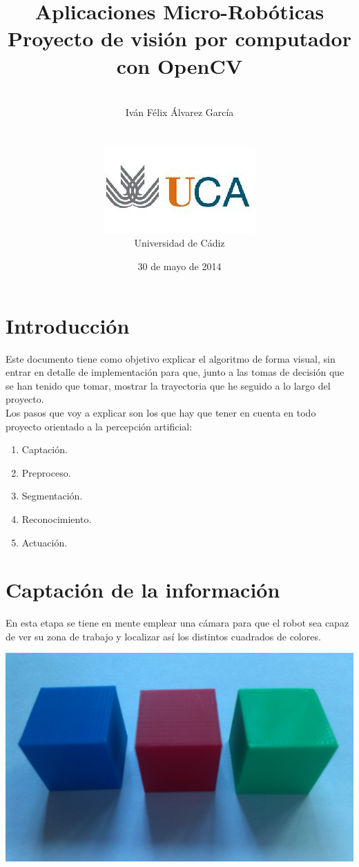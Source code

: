 \documentclass[11pt]{article}
\title{\textbf{Aplicaciones Micro-Robóticas\\
		       Proyecto de visión por computador con OpenCV}}
\author{\\Iván Félix Álvarez García\\\\\\
		\includegraphics[scale=0.45]{logo_uca}\\
		Universidad de Cádiz}
\date{30 de mayo de 2014}
\begin{document}
\maketitle
\newpage

\section{Introducción}

Este documento tiene como objetivo explicar el algoritmo de forma visual, sin entrar en detalle de implementación para que, junto a las tomas de decisión que se han tenido que tomar, mostrar la trayectoria que he seguido a lo largo del proyecto.
\\
Los pasos que voy a explicar son los que hay que tener en cuenta en todo proyecto orientado a la percepción artificial:

\begin{enumerate}
\item Captación.
\item Preproceso.
\item Segmentación.
\item Reconocimiento.
\item Actuación.
\end{enumerate}

\section{Captación de la información}
En esta etapa se tiene en mente emplear una cámara para que el robot sea capaz de ver su zona de trabajo y localizar así los distintos cuadrados de colores.

\begin{center}\includegraphics[scale=0.05]{img1}\end{center}
\end{document}
